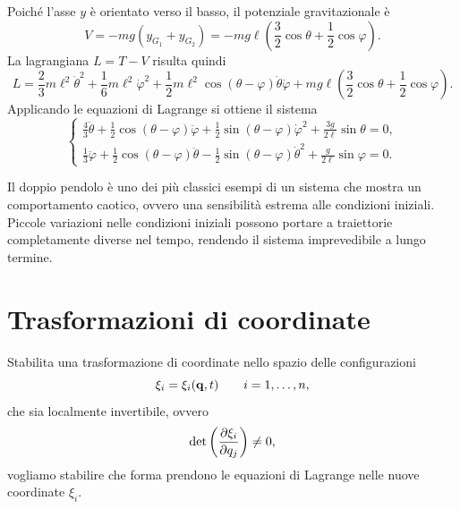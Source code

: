 \begin{example}
    Poiché l'asse $y$ è orientato verso il basso, il potenziale gravitazionale è
    \begin{equation*}
        V = -mg(y_{G_1}+y_{G_2})
        = -mg\ell\left(\frac{3}{2}\cos\theta + \frac{1}{2}\cos\varphi\right).
    \end{equation*}
    La lagrangiana $L = T - V$ risulta quindi
    \begin{equation*}
        L = \frac{2}{3}m\ell^2\dot{\theta}^2
        + \frac{1}{6}m\ell^2\dot{\varphi}^2
        + \frac{1}{2}m\ell^2\cos(\theta-\varphi)\dot{\theta}\dot{\varphi}
        + mg\ell\left(\frac{3}{2}\cos\theta + \frac{1}{2}\cos\varphi\right).
    \end{equation*}
    Applicando le equazioni di Lagrange si ottiene il sistema
    \begin{equation*}
        \begin{cases}
            \displaystyle
            \frac{4}{3}\ddot{\theta}
            + \frac{1}{2}\cos(\theta-\varphi)\ddot{\varphi}
            + \frac{1}{2}\sin(\theta-\varphi)\dot{\varphi}^2
            + \frac{3g}{2\ell}\sin\theta = 0, \\[0.8em]
            \displaystyle
            \frac{1}{3}\ddot{\varphi}
            + \frac{1}{2}\cos(\theta-\varphi)\ddot{\theta}
            - \frac{1}{2}\sin(\theta-\varphi)\dot{\theta}^2
            + \frac{g}{2\ell}\sin\varphi = 0.
        \end{cases}
    \end{equation*}

    \begin{remark}
        Il doppio pendolo è uno dei più classici esempi di un sistema che mostra un comportamento caotico, ovvero una sensibilità estrema alle condizioni iniziali. Piccole variazioni nelle condizioni iniziali possono portare a traiettorie completamente diverse nel tempo, rendendo il sistema imprevedibile a lungo termine.
    \end{remark}
\end{example}


\section{Trasformazioni di coordinate} 
Stabilita una trasformazione di coordinate nello spazio delle configurazioni
\begin{equation*}
    \xi_i = \xi_i(\vb{q}, t) \qquad i = 1, \dots, n,
\end{equation*}
che sia localmente invertibile, ovvero
\begin{equation*}
    \det\left(\pdv{\xi_i}{q_j}\right) \neq 0,
\end{equation*}
vogliamo stabilire che forma prendono le equazioni di Lagrange nelle nuove coordinate $\xi_i$. 

